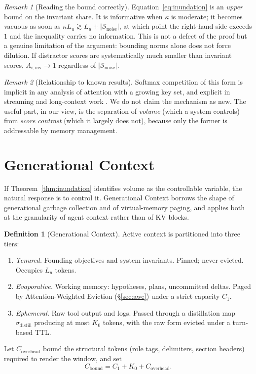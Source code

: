 ﻿\documentclass[11pt,a4paper]{article}
\theoremstyle{plain}
\theoremstyle{definition}
\newtheorem{definition}{Definition}
\theoremstyle{remark}
\newtheorem{remark}{Remark}
\begin{document}
\begin{remark}[Reading the bound correctly]
\label{rem:reading}
Equation~\eqref{eq:inundation} is an \emph{upper} bound on the invariant share.
It is informative when $\kappa$ is moderate; it becomes vacuous as soon as
$\kappa L_u \gtrsim L_u + |\mathcal{S}_{\mathrm{noise}}|$, at which point the
right-hand side exceeds $1$ and the inequality carries no information. This is
not a defect of the proof but a genuine limitation of the argument: bounding
norms alone does not force dilution. If distractor scores are systematically
much smaller than invariant scores, $A_{i,\mathrm{inv}} \to 1$ regardless of
$|\mathcal{S}_{\mathrm{noise}}|$.
\end{remark}

\begin{remark}[Relationship to known results]
Softmax competition of this form is implicit in any analysis of attention with a
growing key set, and explicit in streaming and long-context work
\cite{xiao2023streamingllm,liu2023lost}. We do not claim the mechanism as new.
The useful part, in our view, is the separation of \emph{volume} (which a system
controls) from \emph{score contrast} (which it largely does not), because only
the former is addressable by memory management.
\end{remark}

\section{Generational Context}
\label{sec:gc}

If Theorem~\ref{thm:inundation} identifies volume as the controllable variable,
the natural response is to control it. Generational Context borrows the shape of
generational garbage collection and of virtual-memory paging, and applies both
at the granularity of agent context rather than of KV blocks.

\begin{definition}[Generational Context]
\label{def:gc}
Active context is partitioned into three tiers:
\begin{enumerate}[label=\textbf{Gen-\arabic*}, leftmargin=*]
  \item \emph{Tenured.} Founding objectives and system invariants. Pinned;
        never evicted. Occupies $L_u$ tokens.
  \item \emph{Evaporative.} Working memory: hypotheses, plans, uncommitted
        deltas. Paged by Attention-Weighted Eviction (\S\ref{sec:awe}) under a
        strict capacity $C_1$.
  \item \emph{Ephemeral.} Raw tool output and logs. Passed through a
        distillation map $\sigma_{\mathrm{distill}}$ producing at most $K_0$
        tokens, with the raw form evicted under a turn-based TTL.
\end{enumerate}
Let $C_{\mathrm{overhead}}$ bound the structural tokens (role tags, delimiters,
section headers) required to render the window, and set
\begin{equation}
  C_{\mathrm{bound}} = C_1 + K_0 + C_{\mathrm{overhead}} .
\end{equation}
\end{definition}
\end{document}
